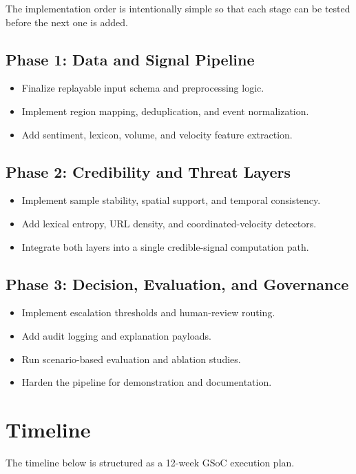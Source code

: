 \documentclass[11pt,a4paper]{article}
\begin{document}
The implementation order is intentionally simple so that each stage can be tested before the next one is added.

\subsection*{Phase 1: Data and Signal Pipeline}
\begin{itemize}
\item Finalize replayable input schema and preprocessing logic.
\item Implement region mapping, deduplication, and event normalization.
\item Add sentiment, lexicon, volume, and velocity feature extraction.
\end{itemize}

\subsection*{Phase 2: Credibility and Threat Layers}
\begin{itemize}
\item Implement sample stability, spatial support, and temporal consistency.
\item Add lexical entropy, URL density, and coordinated-velocity detectors.
\item Integrate both layers into a single credible-signal computation path.
\end{itemize}

\subsection*{Phase 3: Decision, Evaluation, and Governance}
\begin{itemize}
\item Implement escalation thresholds and human-review routing.
\item Add audit logging and explanation payloads.
\item Run scenario-based evaluation and ablation studies.
\item Harden the pipeline for demonstration and documentation.
\end{itemize}

\section{Timeline}

The timeline below is structured as a 12-week GSoC execution plan.
\end{document}

